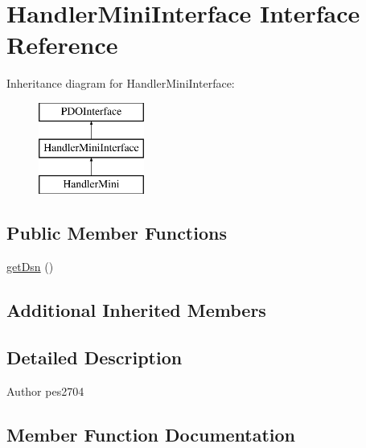 \hypertarget{interface_pes_1_1_database_1_1_handler_1_1_mini_1_1_handler_mini_interface}{}\section{Handler\+Mini\+Interface Interface Reference}
\label{interface_pes_1_1_database_1_1_handler_1_1_mini_1_1_handler_mini_interface}
Inheritance diagram for Handler\+Mini\+Interface\+:\begin{figure}[H]
\begin{center}
\leavevmode
\includegraphics[height=3.000000cm]{interface_pes_1_1_database_1_1_handler_1_1_mini_1_1_handler_mini_interface}
\end{center}
\end{figure}
\subsection*{Public Member Functions}
\begin{DoxyCompactItemize}
\item 
\mbox{\hyperlink{interface_pes_1_1_database_1_1_handler_1_1_mini_1_1_handler_mini_interface_a4a0bf8061a4ee59b487f17625cb37e13}{get\+Dsn}} ()
\end{DoxyCompactItemize}
\subsection*{Additional Inherited Members}


\subsection{Detailed Description}
\begin{DoxyAuthor}{Author}
pes2704 
\end{DoxyAuthor}


\subsection{Member Function Documentation}
\mbox{\label{interface_pes_1_1_database_1_1_handler_1_1_mini_1_1_handler_mini_interface_a4a0bf8061a4ee59b487f17625cb37e13}} 
